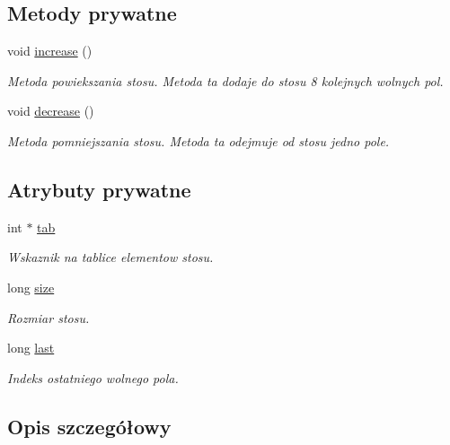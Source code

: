 \subsection*{Metody prywatne}
\begin{DoxyCompactItemize}
\item 
void \hyperlink{class_stos_aaf6e4717d1983c5351c9f5e9797368d3}{increase} ()
\begin{DoxyCompactList}\small\item\em Metoda powiekszania stosu. Metoda ta dodaje do stosu 8 kolejnych wolnych pol. \end{DoxyCompactList}\item 
void \hyperlink{class_stos_a29453758c37530dac9de0e795ba97267}{decrease} ()
\begin{DoxyCompactList}\small\item\em Metoda pomniejszania stosu. Metoda ta odejmuje od stosu jedno pole. \end{DoxyCompactList}\end{DoxyCompactItemize}
\subsection*{Atrybuty prywatne}
\begin{DoxyCompactItemize}
\item 
int $\ast$ \hyperlink{class_stos_abcb666dd5a69fe50228595dc8ac4160a}{tab}
\begin{DoxyCompactList}\small\item\em Wskaznik na tablice elementow stosu. \end{DoxyCompactList}\item 
long \hyperlink{class_stos_a07ba18a24f8f0dbd9144406d15bcd342}{size}
\begin{DoxyCompactList}\small\item\em Rozmiar stosu. \end{DoxyCompactList}\item 
long \hyperlink{class_stos_ae0623cdf9b6725e38da86b74972d61ba}{last}
\begin{DoxyCompactList}\small\item\em Indeks ostatniego wolnego pola. \end{DoxyCompactList}\end{DoxyCompactItemize}


\subsection{Opis szczegółowy}


